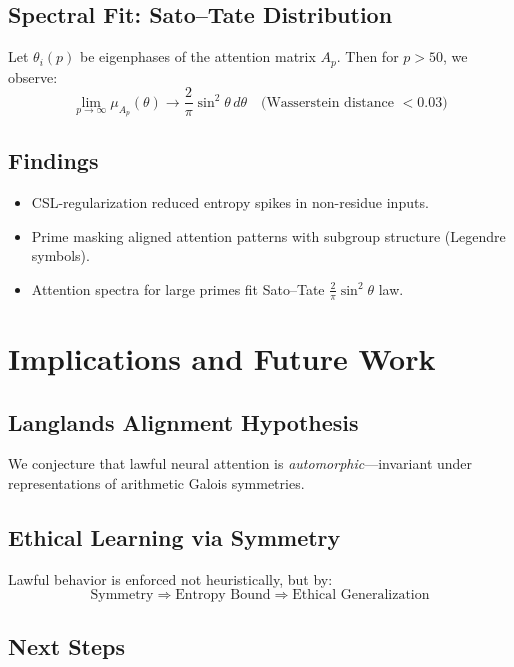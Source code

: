 \documentclass[12pt]{article}
\begin{document}
\subsection{Spectral Fit: Sato–Tate Distribution}

\begin{theorem}
Let $\theta_i(p)$ be eigenphases of the attention matrix $A_p$. Then for $p > 50$, we observe:
\[
\lim_{p \to \infty} \mu_{A_p}(\theta) \to \frac{2}{\pi}\sin^2\theta \, d\theta \quad \text{(Wasserstein distance } < 0.03)
\]
\end{theorem}

\subsection{Findings}

\begin{itemize}
  \item CSL-regularization reduced entropy spikes in non-residue inputs.
  \item Prime masking aligned attention patterns with subgroup structure (Legendre symbols).
  \item Attention spectra for large primes fit Sato–Tate $\frac{2}{\pi}\sin^2\theta$ law.
\end{itemize}

\section{Implications and Future Work}

\subsection{Langlands Alignment Hypothesis}
We conjecture that lawful neural attention is \emph{automorphic}—invariant under representations of arithmetic Galois symmetries.

\subsection{Ethical Learning via Symmetry}

Lawful behavior is enforced not heuristically, but by:
\[
\text{Symmetry} \Longrightarrow \text{Entropy Bound} \Longrightarrow \text{Ethical Generalization}
\]

\subsection{Next Steps}
\end{document}
